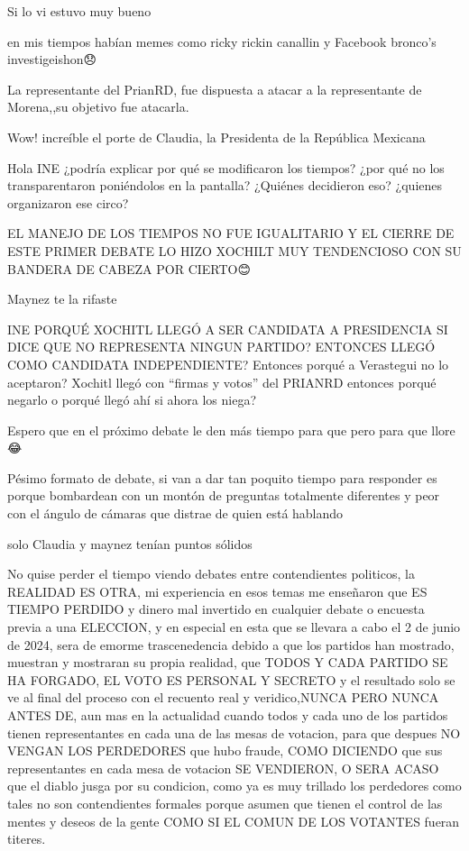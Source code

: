 Si lo vi estuvo muy bueno

en mis tiempos habían memes como ricky rickin canallin y Facebook bronco’s investigeishon😞

La representante del PrianRD, fue dispuesta a atacar a la representante de Morena,,su objetivo fue atacarla.

Wow! increíble el porte de Claudia, la Presidenta de la República Mexicana

Hola INE ¿podría explicar por qué se modificaron los tiempos? ¿por qué no los transparentaron poniéndolos en la pantalla? ¿Quiénes decidieron eso? ¿quienes organizaron ese circo?

EL MANEJO DE LOS TIEMPOS NO FUE IGUALITARIO Y EL CIERRE DE ESTE PRIMER DEBATE LO HIZO XOCHILT MUY TENDENCIOSO CON SU BANDERA DE CABEZA POR CIERTO😊

Maynez te la rifaste

INE PORQUÉ XOCHITL LLEGÓ A SER CANDIDATA A PRESIDENCIA SI DICE QUE NO REPRESENTA NINGUN PARTIDO? ENTONCES LLEGÓ COMO CANDIDATA INDEPENDIENTE? Entonces porqué a Verastegui no lo aceptaron? Xochitl llegó con “firmas y votos” del PRIANRD entonces porqué negarlo o porqué llegó ahí si ahora los niega?

Espero que en el próximo debate le den más tiempo para que pero para que llore 😂

Pésimo formato de debate, si van a dar tan poquito tiempo para responder es porque bombardean con un montón de preguntas totalmente diferentes y peor con el ángulo de cámaras que distrae de quien está hablando

solo Claudia y maynez tenían puntos sólidos

No quise perder el tiempo viendo debates entre contendientes politicos, la REALIDAD ES OTRA, mi experiencia en esos temas me enseñaron que ES TIEMPO PERDIDO  y dinero mal invertido en cualquier debate o encuesta previa a una ELECCION, y en especial en esta que se llevara a cabo el 2 de junio de 2024,  sera de emorme trascenedencia debido a que los partidos han mostrado, muestran y mostraran su propia realidad, que TODOS Y CADA PARTIDO SE HA FORGADO,  EL VOTO ES PERSONAL Y SECRETO y el resultado  solo se ve al final del proceso con el recuento real y veridico,NUNCA PERO NUNCA ANTES DE, aun mas en la actualidad cuando todos y cada uno de los partidos tienen representantes en cada una de las mesas de votacion, para que despues NO VENGAN LOS PERDEDORES que hubo fraude, COMO DICIENDO que sus representantes en cada mesa de votacion SE VENDIERON, O SERA ACASO que el diablo jusga por su condicion, como ya es muy trillado los perdedores como tales no son contendientes formales porque asumen que tienen el control de las mentes y deseos de la gente COMO SI EL COMUN DE LOS VOTANTES fueran titeres.

